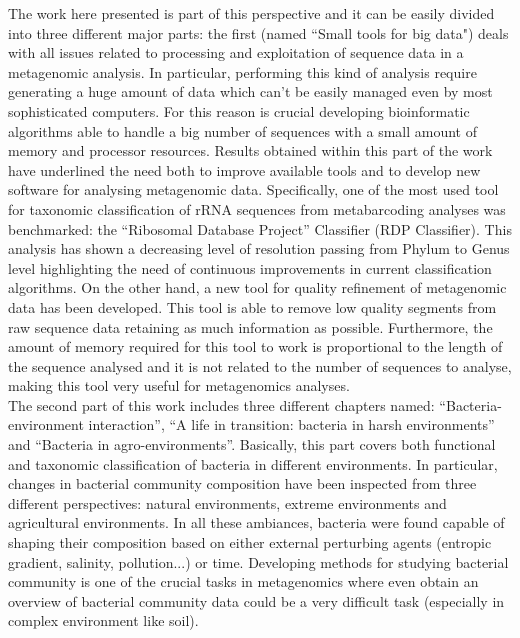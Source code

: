 The work here presented is part of this perspective and it can be easily divided into three different major parts: the first (named ``Small tools for big data") deals with all issues related to processing and exploitation of sequence data in a metagenomic analysis. In particular, performing this kind of analysis require generating a huge amount of data which can't be easily managed even by most sophisticated computers. For this reason is crucial developing bioinformatic algorithms able to handle a big number of sequences with a small amount of memory and processor resources. Results obtained within this part of the work have underlined the need both to improve available tools and to develop new software for analysing metagenomic data. Specifically, one of the most used tool for taxonomic classification of rRNA sequences from metabarcoding analyses was benchmarked: the ``Ribosomal Database Project'' Classifier (RDP Classifier). This analysis has shown a decreasing level of resolution passing from Phylum to Genus level highlighting the need of continuous improvements in current classification algorithms. On the other hand, a new tool for quality refinement of metagenomic data has been developed. This tool is able to remove low quality segments from raw sequence data retaining as much information as possible. Furthermore, the amount of memory required for this tool to work is proportional to the length of the sequence analysed and it is not related to the number of sequences to analyse, making this tool very useful for metagenomics analyses.\\
The second part of this work includes three different chapters named: ``Bacteria-environment interaction'', ``A life in transition: bacteria in harsh environments'' and ``Bacteria in agro-environments''. Basically, this part covers both functional and taxonomic classification of bacteria in different environments. In particular, changes in bacterial community composition have been inspected from three different perspectives: natural environments, extreme environments and agricultural environments. In all these ambiances, bacteria were found capable of shaping their composition based on either external perturbing agents (entropic gradient, salinity, pollution...) or time. Developing methods for studying bacterial community is one of the crucial tasks in metagenomics where even obtain an overview of bacterial community data could be a very difficult task (especially in complex environment like soil).\\
